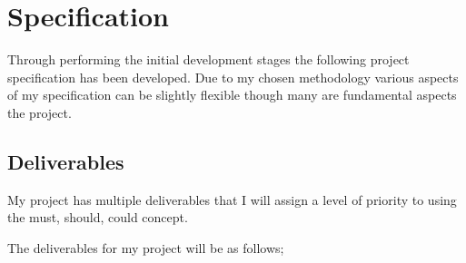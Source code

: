 \section{Specification}\label{specification}

Through performing the initial development stages the following project
specification has been developed. Due to my chosen methodology various
aspects of my specification can be slightly flexible though many are
fundamental aspects the project.

\subsection{Deliverables}\label{deliverables}

My project has multiple deliverables that I will assign a level of
priority to using the must, should, could concept.

The deliverables for my project will be as follows;

